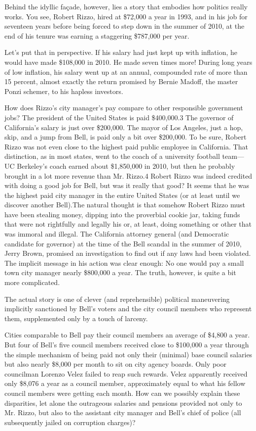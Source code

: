 \documentclass[10pt]{article}
\begin{document}
{\large Behind the idyllic fa\c{c}ade, however, lies a story that embodies how
politics really works. You see, Robert Rizzo, hired at \$72,000 a year in 1993,
and in his job for seventeen years before being forced to step down in the summer
of 2010, at the end of his tenure was earning a staggering \$787,000 per year.}

{\large Let's put that in perspective. If his salary had just kept up with
inflation, he would have made \$108,000 in 2010. He made seven times more! During
long years of low inflation, his salary went up at an annual, compounded rate of
more than 15 percent, almost exactly the return promised by Bernie Madoff, the
master Ponzi schemer, to his hapless investors.}

{\large How does Rizzo's city manager's pay compare to other responsible
government jobs? The president of the United States is paid \$400,000.3 The
governor of California's salary is just over \$200,000. The mayor of Los Angeles,
just a hop, skip, and a jump from Bell, is paid only a bit over \$200,000. To be
sure, Robert Rizzo was not even close to the highest paid public employee in
California. That distinction, as in most states, went to the coach of a
university football team---UC Berkeley's coach earned about \$1,850,000 in 2010,
but then he probably brought in a lot more revenue than Mr. Rizzo.4 Robert Rizzo
was indeed credited with doing a good job for Bell, but was it really that good?
It seems that he was the highest paid city manager in the entire United States
(or at least until we discover another Bell).The natural thought is that somehow
Robert Rizzo must have been stealing money, dipping into the proverbial cookie
jar, taking funds that were not rightfully and legally his or, at least, doing
something or other that was immoral and illegal. The California attorney general
(and Democratic candidate for governor) at the time of the Bell scandal in the
summer of 2010, Jerry Brown, promised an investigation to find out if any laws
had been violated. The implicit message in his action was clear enough: No one
would pay a small town city manager nearly \$800,000 a year. The truth, however,
is quite a bit more complicated.}

{\large The actual story is one of clever (and reprehensible) political
maneuvering implicitly sanctioned by Bell's voters and the city council members
who represent them, supplemented only by a touch of larceny.}

{\large Cities comparable to Bell pay their council members an average of
\$4,800 a year. But four of Bell's five council members received close to
\$100,000 a year through the simple mechanism of being paid not only their
(minimal) base council salaries but also nearly \$8,000 per month to sit on city
agency boards. Only poor councilman Lorenzo Velez failed to reap such rewards.
Velez apparently received only \$8,076 a year as a council member, approximately
equal to what his fellow council members were getting each month. How can we
possibly explain these disparities, let alone the outrageous salaries and
pensions provided not only to Mr. Rizzo, but also to the assistant city manager
and Bell's chief of police (all subsequently jailed on corruption charges)?}
\end{document}
